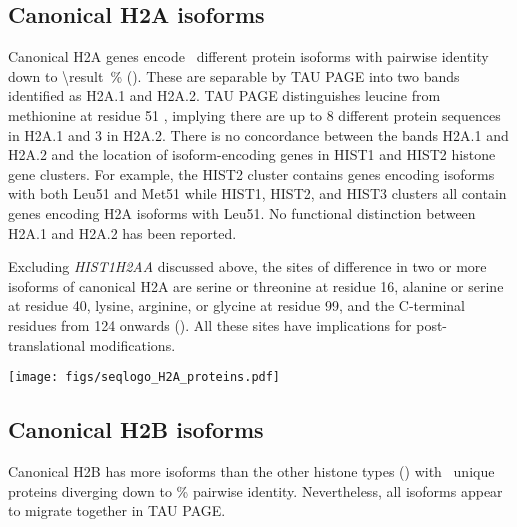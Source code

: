 
  \subsection{Canonical H2A isoforms}
    Canonical H2A genes encode \HTwoAUniqueProteins{}~different
    protein isoforms with pairwise identity down to
     \SI{\result}{\percent} ().
    These are separable by TAU PAGE into two bands identified as H2A.1 and H2A.2.
    TAU PAGE distinguishes leucine from methionine at residue 51 \citep{FranklinZweidler1977,Zweidler1977},
    implying there are up to 8 different protein sequences in H2A.1 and 3 in H2A.2.
    There is no concordance between the bands H2A.1 and H2A.2
    and the location of isoform-encoding genes in HIST1 and HIST2 histone gene clusters.
    For example, the HIST2 cluster contains genes encoding isoforms with both Leu51 and Met51
    while HIST1, HIST2, and HIST3 clusters all contain genes encoding H2A isoforms with Leu51.
    No functional distinction between H2A.1 and H2A.2 has been reported.

    Excluding \textit{HIST1H2AA} discussed above,
    the sites of difference in two or more isoforms of canonical H2A are
    serine or threonine at residue 16,
    alanine or serine at residue 40,
    lysine, arginine, or glycine at residue 99,
    and the C-terminal residues from 124 onwards ().
    All these sites have implications for post-translational modifications.

    \begin{table}
      \caption{%
        Canonical H2A encoded protein isoforms.
        Upper panel shows isoform variations relative to the most numerous protein isoform
        using HGVS recommended nomenclature \citep{mutnomenclature2003}.
        Lower panel shows sequence logo of all isoforms aligned
        with invariant residues in grey.
      }
      \label{tab:H2A-consensus}
      
      \texttt{[image: figs/seqlogo\_H2A\_proteins.pdf]}
    \end{table}

  \subsection{Canonical H2B isoforms}
    Canonical H2B has more isoforms than the other histone types ()
    with \HTwoBUniqueProteins{}~unique proteins
    diverging down to \result\% pairwise identity.
    Nevertheless, all isoforms appear to migrate together in TAU PAGE.

